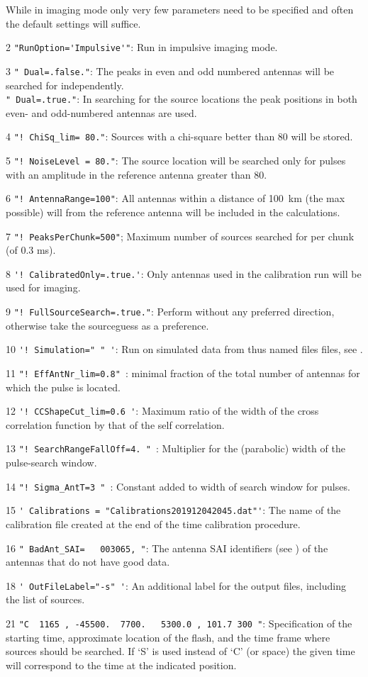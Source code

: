 While in imaging mode only very few parameters need to be specified and often the default settings will suffice.
\begin{enumerate*}
\item[2] \verb#"RunOption='Impulsive'"#: Run in impulsive imaging mode.
\item[3] \verb!" Dual=.false."!: The peaks in even and odd numbered antennas will be searched for independently.  \\
    \verb!" Dual=.true."!: In searching for the source locations the peak positions in both even- and odd-numbered antennas are used.
\item[4] \verb#"! ChiSq_lim= 80."#: Sources with a chi-square better than 80 will be stored.
\item[5] \verb#"! NoiseLevel = 80."#: The source location will be searched only for pulses with an amplitude in the reference antenna greater than 80.
\item[6] \verb#"! AntennaRange=100"#: All antennas within a distance of 100~km (the max possible) will from the reference antenna will be included in the calculations.
\item[7] \verb#"! PeaksPerChunk=500"#; Maximum number of sources searched for per chunk (of 0.3 ms).
\item[8] \verb#'! CalibratedOnly=.true.'#: Only antennas used in the calibration run will be used for imaging.
\item[9] \verb#"! FullSourceSearch=.true."#: Perform without any preferred direction, otherwise take the sourceguess as a preference.
\item[10] \verb#'! Simulation=" " '#: Run on simulated data from thus named files files, see .
\item[11] \verb#"! EffAntNr_lim=0.8" #:  minimal fraction of the total number of antennas for which the pulse is located.
\item[12] \verb#'! CCShapeCut_lim=0.6 '#:  Maximum ratio of the width of the cross correlation function by that of the self correlation.
\item[13] \verb#"! SearchRangeFallOff=4. " #:  Multiplier for the (parabolic) width of the pulse-search window.
\item[14] \verb#"! Sigma_AntT=3 " #:  Constant added to width of search window for pulses.

\item[15] \verb!' Calibrations = "Calibrations201912042045.dat"'!: The name of the calibration file created at the end of the time calibration procedure.
\item[16] \verb#" BadAnt_SAI=   003065, "#: The antenna SAI identifiers (see ) of the antennas that do not have good data.
\item[18] \verb#' OutFileLabel="-s" '#: An additional label for the output files, including the list of sources.
\item[21] \verb#"C  1165 , -45500.  7700.   5300.0 , 101.7 300 "#: Specification of the starting time, approximate location of the flash, and the time frame where sources should be searched. If `S' is used instead of `C' (or space) the given time will correspond to the time at the indicated position.
\end{enumerate*}

